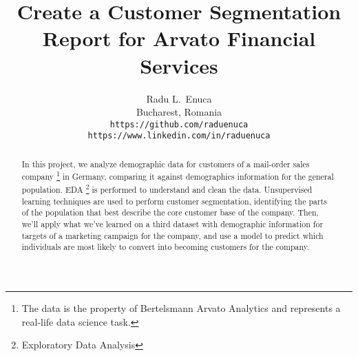 \documentclass{article}
\title{Create a Customer Segmentation Report for Arvato Financial Services}
\author{
  Radu L.~Enuca \\
  Bucharest, Romania \\
  \texttt{https://github.com/raduenuca} \\
  \texttt{https://www.linkedin.com/in/raduenuca}
}
\begin{document}
\maketitle

\begin{abstract}
In this project, we analyze demographic data for customers of a mail-order sales company \footnote{The data is the property of Bertelsmann Arvato Analytics and represents a real-life data science task.} in Germany, comparing it against demographics information for the general population. EDA \footnote{Exploratory Data Analysis} is performed to understand and clean the data. Unsupervised learning techniques are used to perform customer segmentation, identifying the parts of the population that best describe the core customer base of the company. Then, we'll apply what we've learned on a third dataset with demographic information for targets of a marketing campaign for the company, and use a model to predict which individuals are most likely to convert into becoming customers for the company.
\end{abstract}












\printbibliography


\end{document}
